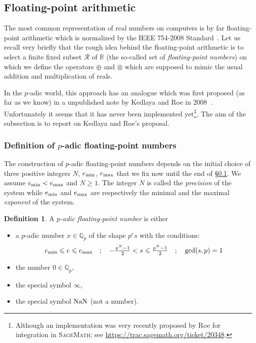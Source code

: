 \documentclass[11pt]{article}
\numberwithin{equation}{section}
\numberwithin{figure}{section}
\renewcommand{\leq}{\leqslant}
\renewcommand{\geq}{\geqslant}
\theoremstyle{definition}
\newtheorem{deftn}[theo]{Definition}
\newcommand{\Q}{\mathbb Q}
\newcommand{\Qp}{\Q_p}
\newcommand{\R}{\mathbb R}
\newcommand{\calR}{\mathcal R}
\renewcommand{\min}{\text{\rm min}}
\renewcommand{\max}{\text{\rm max}}
\newcommand{\nan}{\text{\rm NaN}}
\newcommand{\sagenoref}{\textsc{SageMath}\xspace}
\begin{document}
\subsection{Floating-point arithmetic}
\label{ssec:pfloat}

The most common representation of real numbers on computers is
by far floating-point arithmetic which is normalized by the
IEEE 754-2008 Standard~\cite{IEEE08,Mu09}.
Let us recall very briefly that the rough idea behind the floating-point 
arithmetic is to select a finite fixed subset $\calR$ of $\R$ 
(the so-called set of \emph{floating-point numbers}) on which we
define the operators $\oplus$ and $\otimes$ which are supposed to mimic
the usual addition and multiplication of reals.

In the $p$-adic world, this approach has an analogue which was first 
proposed (as far as we know) in a unpublished note by Kedlaya and Roe 
in 2008~\cite{KeRo08}. Unfortunately it seems that it has never been implemented 
yet\footnote{Although an implementation was very recently proposed by 
Roe for integration in \sagenoref; see 
\url{https://trac.sagemath.org/ticket/20348}.}. The aim of the 
subsection is to report on Kedlaya and Roe's proposal.

\subsubsection{Definition of $p$-adic floating-point numbers}

The construction of $p$-adic floating-point numbers depends on the 
initial choice of three positive integers $N$, $e_\min$, $e_\max$ that 
we fix now until the end of \S \ref{ssec:pfloat}. We assume $e_\min < 
e_\max$ and $N \geq 1$.
The integer $N$ is called the \emph{precision} of the system while 
$e_\min$ and $e_\max$ are respectively the minimal and the maximal 
\emph{exponent} of the system.

\begin{deftn}
A \emph{$p$-adic floating-point number} is either 
\begin{itemize}
\renewcommand{\itemsep}{0pt}
\item a $p$-adic number $x \in \Qp$ of the shape $p^e s$ with the 
conditions:
\begin{equation}
\label{eq:condpFP}
\textstyle
e_\min \leq e \leq e_\max \quad ; \quad
-\frac{p^N-1} 2 < s \leq \frac{p^N-1} 2 \quad ; \quad
\gcd(s,p) = 1
\end{equation}
\item the number $0 \in \Qp$,
\item the special symbol $\infty$,
\item the special symbol $\nan$ (not a number).
\end{itemize}
\end{deftn}
\end{document}
